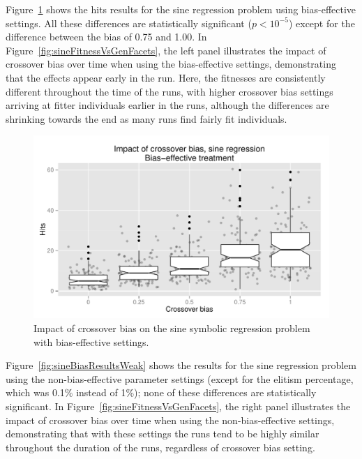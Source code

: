 \documentclass{sig-alternate}
\begin{document}
Figure~\ref{fig:sineBiasResultsStrong} shows the hits results for the sine regression problem using bias-effective
settings. All these differences are statistically significant ($p < 10^{-5}$) except for the difference between the
bias of 0.75 and 1.00. In Figure~\ref{fig:sineFitnessVsGenFacets}, the left panel illustrates the impact of crossover
bias over time when using the bias-effective settings, demonstrating that the effects appear early in the run. Here,
the fitnesses are consistently different throughout the time of the runs, with higher crossover bias settings arriving
at fitter individuals earlier in the runs, although the differences are shrinking towards the end as many runs find
fairly fit individuals.

\begin{figure}
\centering
\includegraphics[width=0.45 \textwidth]{Plots/Sine_XO_impact_strong_boxplot.pdf}
\caption{Impact of crossover bias on the sine symbolic regression problem with bias-effective settings.}
\label{fig:sineBiasResultsStrong}
\end{figure}

%
%
%
%

%
%
%
%

Figure~\ref{fig:sineBiasResultsWeak} shows the results for the sine regression problem using the non-bias-effective
parameter settings (except for the elitism percentage, which was 0.1\% instead of 1\%); none of these differences are
statistically significant. In Figure~\ref{fig:sineFitnessVsGenFacets}, the right panel illustrates the impact of
crossover bias over time when using the non-bias-effective settings, demonstrating that with these settings the runs
tend to be highly similar throughout the duration of the runs, regardless of crossover bias setting. 
\end{document}
